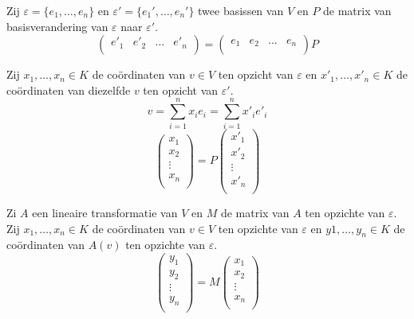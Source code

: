 \documentclass[main.tex]{subfiles}
\begin{document}
\begin{st}
  Zij $\varepsilon = \{e_{1},\dotsc,e_{n}\}$ en $\varepsilon'= \{ e_{1}',\dotsc,e_{n}'\}$ twee basissen van $V$ en $P$ de matrix van basisverandering van $\varepsilon$ naar $\varepsilon'$.
  \[ 
  \begin{pmatrix}
    e'_{1} & e'_{2} & \hdots & e'_{n}\\
  \end{pmatrix}
  =
  \begin{pmatrix}
    e_{1} & e_{2} & \hdots & e_{n}\\
  \end{pmatrix}
  P
  \]
\end{st}
 
\begin{st}
  Zij $x_{1},\dotsc,x_{n}\in K$ de co\"ordinaten van $v\in V$ ten opzicht van $\varepsilon$ en $x'_{1},\dotsc,x'_{n}\in K$ de co\"ordinaten van diezelfde $v$ ten opzicht van $\varepsilon'$.
  \[ v = \sum_{i=1}^{n}x_{i}e_{i} = \sum_{i=1}^{n}x'_{i}e'_{i}\]
  \[ 
  \begin{pmatrix}
    x_{1} \\ x_{2} \\ \vdots \\ x_{n}\\
  \end{pmatrix}
  =
  P
  \begin{pmatrix}
    x'_{1} \\ x'_{2} \\ \vdots \\ x'_{n}\\
  \end{pmatrix}
  \]
\end{st}

\begin{st}
  Zi $A$ een lineaire transformatie van $V$ en $M$ de matrix van $A$ ten opzichte van $\varepsilon$.
  Zij $x_{1},\dotsc,x_{n}\in K$ de co\"ordinaten van $v\in V$ ten opzichte van $\varepsilon$ en $y{1},\dotsc,y_{n}\in K$ de co\"ordinaten van $A(v)$ ten opzichte van $\varepsilon$.
  \[ 
  \begin{pmatrix}
    y_{1} \\ y_{2} \\ \vdots \\ y_{n}\\
  \end{pmatrix}
  =
  M
  \begin{pmatrix}
    x_{1} \\ x_{2} \\ \vdots \\ x_{n}\\
  \end{pmatrix}
  \]
\end{st}
\end{document}
